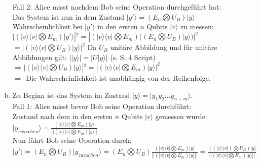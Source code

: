 \documentclass[a4paper]{scrartcl}
\begin{document}
\begin{enumerate}[a)]
\noindent Fall 2: Alice misst nachdem Bob seine Operation durchgeführt hat:\\
Das System ist nun in dem Zustand $|y'\rangle = (E_n\bigotimes U_B)|y\rangle$\\
Wahrscheinlichkeit bei $|y'\rangle$ in den ersten $n$ Qubits $|v\rangle$ zu messen:\\
$|(|v\rangle \langle v|\bigotimes E_m)|y'\rangle|^2= |(|v\rangle \langle v|\bigotimes E_m)((E_n\bigotimes U_B)|y\rangle)|^2$\\
$=|(|v\rangle \langle v|\bigotimes U_B) |y\rangle|^2$ Da $U_B$ unitäre Abbildung und für unitäre Abbildungen gilt: $| |y\rangle | = |U |y\rangle|$ (s. S. 4 Script)\\
$\Rightarrow  |(|v\rangle \langle v|\bigotimes U_B) |y\rangle|^2 = |(|v\rangle \langle v|\bigotimes E_m) |y\rangle|^2$\\
$\Rightarrow$ Die Wahrscheinlichkeit ist unabhängig von der Reihenfolge.\\

\item Zu Beginn ist das System im Zustand $|y\rangle =|y_1y_2...y_{n+m}\rangle$. \\
Fall 1: Alice misst bevor Bob seine Operation durchführt:\\
Zustand nach dem in den ersten $n$ Qubits $|v\rangle$ gemessen wurde: $|y_{zwischen}\rangle= \frac{(|v\rangle\langle v|\bigotimes E_m)|y\rangle}{||(|v\rangle\langle v|\bigotimes E_m)|y\rangle||}$\\
Nun führt Bob seine Operation durch:\\
$|y'\rangle = (E_n\bigotimes U_B)|y_{zwischen}\rangle= (E_n\bigotimes U_B)\frac{(|v\rangle\langle v|\bigotimes E_m)|y\rangle}{||(|v\rangle\langle v|\bigotimes E_m)|y\rangle||}= \frac{((|v\rangle\langle v|)\bigotimes U_B)|y\rangle}{||(|v\rangle\langle v|\bigotimes E_m)|y\rangle||}$\\


\end{enumerate}
\end{document}
